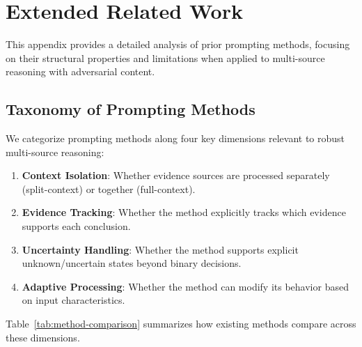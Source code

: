 \section{Extended Related Work}
\label{app:related}

This appendix provides a detailed analysis of prior prompting methods, focusing on their structural properties and limitations when applied to multi-source reasoning with adversarial content.

\subsection{Taxonomy of Prompting Methods}

We categorize prompting methods along four key dimensions relevant to robust multi-source reasoning:

\begin{enumerate}[nosep]
    \item \textbf{Context Isolation}: Whether evidence sources are processed separately (split-context) or together (full-context).
    \item \textbf{Evidence Tracking}: Whether the method explicitly tracks which evidence supports each conclusion.
    \item \textbf{Uncertainty Handling}: Whether the method supports explicit unknown/uncertain states beyond binary decisions.
    \item \textbf{Adaptive Processing}: Whether the method can modify its behavior based on input characteristics.
\end{enumerate}

Table~\ref{tab:method-comparison} summarizes how existing methods compare across these dimensions.

